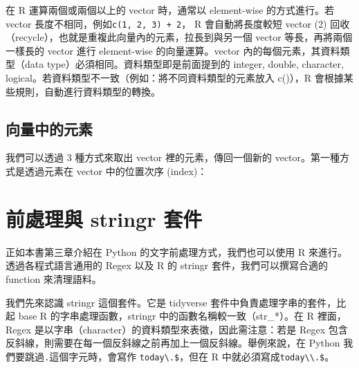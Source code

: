 在 R 運算兩個或兩個以上的 vector 時，通常以 element-wise 的方式進行。若
vector 長度不相同，例如\texttt{c(1,\ 2,\ 3)\ +\ 2}， R 會自動將長度較短
vector (2) 回收（recycle），也就是重複此向量內的元素，拉長到與另一個
vector 等長，再將兩個一樣長的 vector 進行 element-wise
的向量運算。vector 內的每個元素，其資料類型（data
type）必須相同。資料類型即是前面提到的 integer, double, character,
logical。若資料類型不一致（例如：將不同資料類型的元素放入 c()），R
會根據某些規則，自動進行資料類型的轉換。

\hypertarget{ux5411ux91cfux4e2dux7684ux5143ux7d20}{%
\subsection{向量中的元素}\label{ux5411ux91cfux4e2dux7684ux5143ux7d20}}

我們可以透過 3 種方式來取出 vector 裡的元素，傳回一個新的
vector。第一種方式是透過元素在 vector 中的位置次序 (index)：

\begin{Shaded}
\begin{Highlighting}[]

\NormalTok{LETTERS[}\NormalTok{]}

\NormalTok{LETTERS[}\SpecialCharTok{:}\NormalTok{]}

\NormalTok{LETTERS[}\NormalTok{(}\NormalTok{, }\NormalTok{, }\NormalTok{)]}
\end{Highlighting}
\end{Shaded}

\hypertarget{ux524dux8655ux7406ux8207-stringr-ux5957ux4ef6}{%
\section{前處理與 stringr
套件}\label{ux524dux8655ux7406ux8207-stringr-ux5957ux4ef6}}

正如本書第三章介紹在 Python 的文字前處理方式，我們也可以使用 R
來進行。透過各程式語言通用的 Regex 以及 R 的 stringr
套件，我們可以撰寫合適的 function 來清理語料。

我們先來認識 stringr 這個套件。它是 tidyverse
套件中負責處理字串的套件，比起 base R 的字串處理函數，stringr
中的函數名稱較一致（str\_*）。在 R 裡面，Regex
是以字串（character）的資料類型來表徵，因此需注意：若是 Regex
包含反斜線，則需要在每一個反斜線之前再加上一個反斜線。舉例來說，在
Python 我們要跳過\texttt{.}這個字元時，會寫作
\texttt{today\textbackslash{}.\$}，但在 R
中就必須寫成\texttt{today\textbackslash{}\textbackslash{}.\$}。

